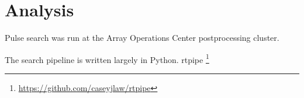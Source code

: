   \section{Analysis}
 
 Pulse search was run at the Array Operations Center postprocessing cluster.
 
 The search pipeline is written largely in Python.
rtpipe \footnote{\url{https://github.com/caseyjlaw/rtpipe}}
 
